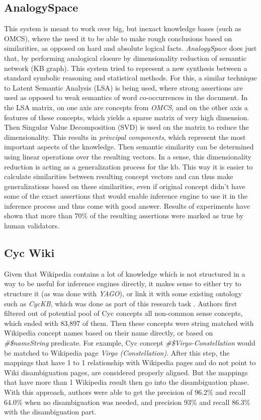 \subsection{AnalogySpace}
This system is meant to work over big, but inexact knowledge bases 
(such as OMCS), where the need it to be able to make rough conclusions based
on similarities, as opposed on hard and absolute logical facts. 
\emph{AnalogySpace} does just that, by performing analogical closure by
dimensionality reduction of semantic network (KB graph)\parencite{Speer2008}. 
This system tried to represent a new synthesis between a standard symbolic 
reasoning and statistical methods. For this, a similar technique to Latent
Semantic Analysis (LSA) is being used, where strong assertions are used as
opposed to weak semantics of word co-occurrences in the document. In the 
LSA matrix, on one axis are concepts from \emph{OMCS}, and on the other
axis a features of these concepts, which yields a sparse matrix of very
high dimension. Then Singular Value Decomposition (SVD) is used on the matrix
to reduce the dimensionality. This results in \emph{principal components},
which represent the most important aspects of the knowledge. Then semantic
similarity can be determined using linear operations over the resulting vectors.
In a sense, this dimensionality reduction is acting as a generalization process
for the kb. This way it is easier to calculate similarities between resulting
concept vectors and can thus make generalizations based on these similarities,
even if original concept didn't have some of the exact assertions that would
enable inference engine to use it in the inference process and thus come with
good answer. 
Results of experiments have shown that more than 70\% of the resulting 
assertions were marked as true by human validators.

\subsection{Cyc Wiki}
Given that Wikipedia contains a lot of knowledge which is not structured in 
a way to be useful for inference engines directly, it makes sense to either try
to structure it (as was done with \emph{YAGO}), or link it with some existing
ontology such as \emph{CycKB}, which was done as part of this research task
\parencite{Medelyan2008}.
Authors first filtered out of potential pool of Cyc concepts all non-common 
sense concepts, which ended with 83,897 of them. Then these concepts were
string matched with Wikipedia concept names based on their name directly,
or based on \emph{\#\$nameString} predicate. For example, Cyc concept
\emph{\#\$Virgo-Constellation} would be matched to Wikipedia page 
\emph{Virgo (Constellation)}. After this step, the mappings that have 1 to 1
relationship with Wikipedia pages and do not point to Wiki disambiguation pages,
are considered properly aligned. But the mappings that have more than 1 
Wikipedia result then go into the disambiguation phase. With this approach,
authors were able to get the precision of 96.2\% and recall 64.0\% when no 
disambiguation was needed, and precision 93\% and recall 86.3\% with the 
disambiguation part.


